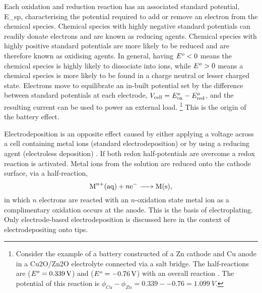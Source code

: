 \documentclass{article}
\begin{document}
Each oxidation and reduction reaction has an associated standard potential, \gls{E_sp}, characterising the  potential required to add or remove an electron from the chemical species. Chemical species with highly negative standard potentials can readily donate electrons and are known as reducing agents. Chemical species with highly positive standard potentials are more likely to be reduced and are therefore known as oxidising agents. In general, having $E^o<0$ means the chemical species is highly likely to dissociate into ions, while $E^o>0$ means a chemical species is more likely to be found in a charge neutral or lesser charged state.
Electrons move to equilibrate an in-built potential set by the difference between standard potentials at each electrode, $V_{\mathrm{cell}} = E^o_{\mathrm{ox}}-E^o_{\mathrm{red}}$, and the resulting current can be used to power an external load.%
\footnote{Consider the example of a battery constructed of a Zn cathode and Cu anode in a Cu\subs2O/Zn\subs2O electrolyte connected via a salt bridge. The half-reactions are  ($E^o=\SI{0.339}{V}$) and  ($E^o=\SI{-0.76}{V}$) with an overall reaction . The potential of this reaction is $\phi_{Cu}-\phi_{Zn}=0.339--0.76=\SI{1.099}{V}$.}
This is the origin of the battery effect.

Electrodeposition is an opposite effect caused by either applying a voltage across a cell containing metal ions (standard electrodeposition) or by using a reducing agent (electroless deposition) \cite{paunovic2006fundamentals}. If both redox half-potentials are overcome a redox reaction is activated. Metal ions from the solution are reduced onto the cathode surface, via a half-reaction,
\begin{equation} \cee{M^{$n$+}(aq) + $n$e- -> M(s)}, \end{equation}
in which $n$ electrons are reacted with an $n$-oxidation state metal ion as a complimentary oxidation occurs at the anode. This is the basis of electroplating. Only electrode-based electrodeposition is discussed here in the context of electrodepositing onto tips.
\end{document}
